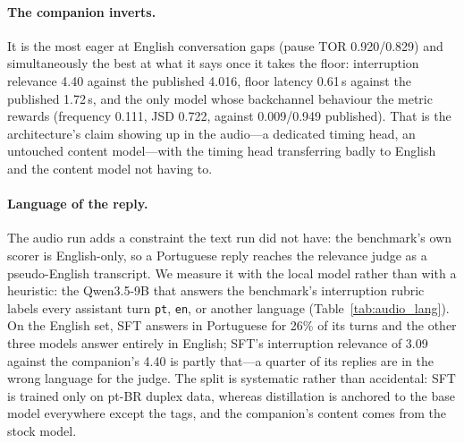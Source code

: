 \documentclass[conference]{IEEEtran}
\begin{document}
\paragraph{The companion inverts.} It is the most eager at English
conversation gaps (pause TOR 0.920/0.829) and simultaneously the best at what it
says once it takes the floor: interruption relevance 4.40 against the published
4.016, floor latency 0.61\,s against the published 1.72\,s, and the only model
whose backchannel behaviour the metric rewards (frequency 0.111, JSD 0.722,
against 0.009/0.949 published). That is the architecture's claim showing up in the
audio---a dedicated timing head, an untouched content model---with the timing head
transferring badly to English and the content model not having to.

\paragraph{Language of the reply.} The audio run adds a constraint the text run did
not have: the benchmark's own scorer is English-only, so a Portuguese reply
reaches the relevance judge as a pseudo-English transcript. We measure it with
the local model rather than with a heuristic: the Qwen3.5-9B that answers the
benchmark's interruption rubric labels every assistant turn \texttt{pt},
\texttt{en}, or another language (Table~\ref{tab:audio_lang}). On the English
set, SFT answers in Portuguese for 26\% of its turns and the other three models
answer entirely in English; SFT's interruption relevance of 3.09 against the
companion's 4.40 is partly that---a quarter of its replies are in the wrong
language for the judge. The split is systematic rather than accidental: SFT is
trained only on pt-BR duplex data, whereas distillation is anchored to the base
model everywhere except the tags, and the companion's content comes from the
stock model.

\begin{table}[t]
\centering
\caption{Invitations on real audio. ``P(floor)'' is the probability of taking
the floor given an invitation---the per-scenario TOR of
Tables~\ref{tab:fdb2} and~\ref{tab:audio_ours} is that rate times the number of
invitations, which is why the two harnesses cannot be compared on the scenario
figure alone.}
\label{tab:audio_inv}
\footnotesize
{}
\end{table}
\end{document}
